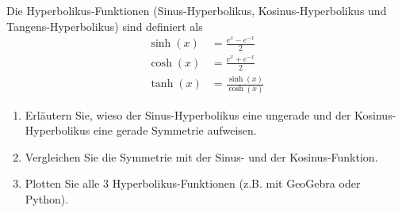 \begin{ExerciseBlock}
Die Hyperbolikus-Funktionen (Sinus-Hyperbolikus,\newline
Kosinus-Hyperbolikus und Tangens-Hyperbolikus) sind definiert als
\begin{equation*}
	\begin{split}
		\sinh(x) &= \frac{e^{x}-e^{-x}}{2} \\ 
		\cosh(x) &= \frac{e^{x}+e^{-x}}{2} \\
		\tanh(x) &= \frac{\sinh(x)}{\cosh(x)}
	\end{split}
\end{equation*}

\begin{enumerate}[label=\alph*)]
	\item Erläutern Sie, wieso der Sinus-Hyperbolikus eine ungerade und der Kosinus-Hyperbolikus eine gerade Symmetrie aufweisen.

	\item Vergleichen Sie die Symmetrie mit der Sinus- und der Kosinus-Funktion.
	
	\item Plotten Sie alle 3 Hyperbolikus-Funktionen (z.B. mit GeoGebra oder Python).
	
\end{enumerate}

\end{ExerciseBlock}
